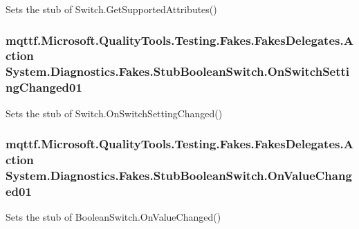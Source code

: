 Sets the stub of Switch.\-Get\-Supported\-Attributes()

\hypertarget{class_system_1_1_diagnostics_1_1_fakes_1_1_stub_boolean_switch_a458bb50dd8bf0336d5cc6a363cf26b2a}{
\subsubsection[{On\-Switch\-Setting\-Changed01}]{\setlength{\rightskip}{0pt plus 5cm}mqttf.\-Microsoft.\-Quality\-Tools.\-Testing.\-Fakes.\-Fakes\-Delegates.\-Action System.\-Diagnostics.\-Fakes.\-Stub\-Boolean\-Switch.\-On\-Switch\-Setting\-Changed01}}\label{class_system_1_1_diagnostics_1_1_fakes_1_1_stub_boolean_switch_a458bb50dd8bf0336d5cc6a363cf26b2a}


Sets the stub of Switch.\-On\-Switch\-Setting\-Changed()

\hypertarget{class_system_1_1_diagnostics_1_1_fakes_1_1_stub_boolean_switch_a3d0e20d86c4268ce0e7f2146151fc3cc}{
\subsubsection[{On\-Value\-Changed01}]{\setlength{\rightskip}{0pt plus 5cm}mqttf.\-Microsoft.\-Quality\-Tools.\-Testing.\-Fakes.\-Fakes\-Delegates.\-Action System.\-Diagnostics.\-Fakes.\-Stub\-Boolean\-Switch.\-On\-Value\-Changed01}}\label{class_system_1_1_diagnostics_1_1_fakes_1_1_stub_boolean_switch_a3d0e20d86c4268ce0e7f2146151fc3cc}


Sets the stub of Boolean\-Switch.\-On\-Value\-Changed()



